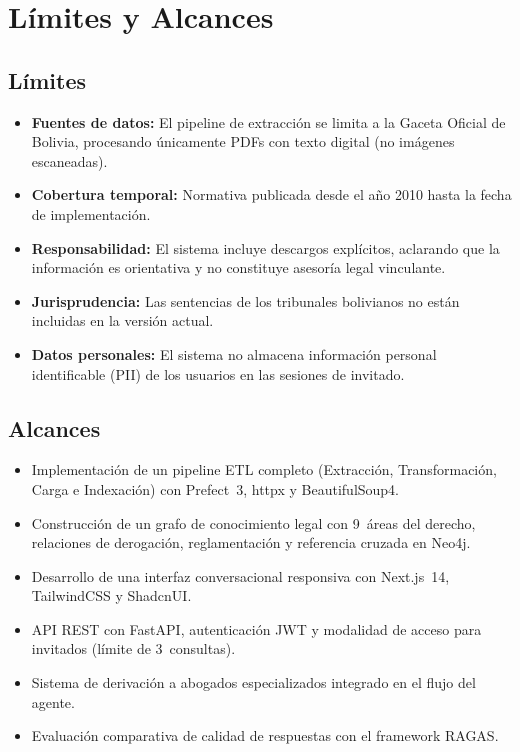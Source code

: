 \documentclass[12pt, letterpaper]{report}
\begin{document}
\section{L\'{i}mites y Alcances}

\subsection{L\'{i}mites}

\begin{itemize}
  \item \textbf{Fuentes de datos:} El pipeline de extracci\'{o}n se limita a la Gaceta Oficial de Bolivia, procesando \'{u}nicamente PDFs con texto digital (no im\'{a}genes escaneadas).
  \item \textbf{Cobertura temporal:} Normativa publicada desde el a\~{n}o 2010 hasta la fecha de implementaci\'{o}n.
  \item \textbf{Responsabilidad:} El sistema incluye descargos expl\'{i}citos, aclarando que la informaci\'{o}n es orientativa y no constituye asesor\'{i}a legal vinculante.
  \item \textbf{Jurisprudencia:} Las sentencias de los tribunales bolivianos no est\'{a}n incluidas en la versi\'{o}n actual.
  \item \textbf{Datos personales:} El sistema no almacena informaci\'{o}n personal identificable (PII) de los usuarios en las sesiones de invitado.
\end{itemize}

\subsection{Alcances}

\begin{itemize}
  \item Implementaci\'{o}n de un pipeline ETL completo (Extracci\'{o}n, Transformaci\'{o}n, Carga e Indexaci\'{o}n) con Prefect~3, httpx y BeautifulSoup4.
  \item Construcci\'{o}n de un grafo de conocimiento legal con 9~\'{a}reas del derecho, relaciones de derogaci\'{o}n, reglamentaci\'{o}n y referencia cruzada en Neo4j.
  \item Desarrollo de una interfaz conversacional responsiva con Next.js~14, TailwindCSS y ShadcnUI.
  \item API REST con FastAPI, autenticaci\'{o}n JWT y modalidad de acceso para invitados (l\'{i}mite de 3~consultas).
  \item Sistema de derivaci\'{o}n a abogados especializados integrado en el flujo del agente.
  \item Evaluaci\'{o}n comparativa de calidad de respuestas con el framework RAGAS.
\end{itemize}
\end{document}
